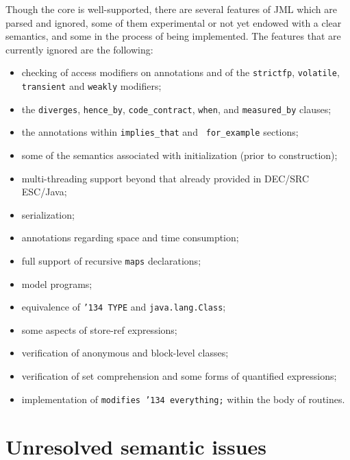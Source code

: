 \documentclass{acm_proc_article-sp}
\begin{document}
Though the core is well-supported, there are several features of JML
which are parsed and ignored, some of them experimental or not yet
endowed with a clear semantics, and some in the process of being implemented.
  The features that are currently ignored are the following:
\setlength{\partopsep}{0in}\setlength{\parskip}{0in}\setlength{\itemsep}{0in}\setlength{\topsep}{0in}
\begin{itemize}
\setlength{\partopsep}{0in}\setlength{\parskip}{0in}\setlength{\itemsep}{0in}\setlength{\topsep}{0in}
\item checking of access modifiers on annotations and of the
 \texttt{strictfp}, \texttt{volatile},
  \texttt{transient} and \texttt{weakly} modifiers;
\item the \texttt{diverges}, \texttt{hence\_by},
  \texttt{code\_contract}, \texttt{when}, and \texttt{measured\_by}
  clauses;
\item the annotations within \texttt{implies\_that} and {\tt
    for\_example} sections;
\item some of the semantics associated with initialization (prior to
  construction);
\item multi-threading support beyond that already provided in DEC/SRC ESC/\-Java;
\item serialization;
\item annotations regarding space and time consumption;
\item full support of recursive \texttt{maps} declarations;
\item model programs;
\item equivalence of \texttt{\char'134 TYPE} and \texttt{java.lang.Class};
\item some aspects of store-ref expressions;
\item verification of anonymous and block-level classes;
\item verification of set comprehension and some forms of quantified
  expressions;
\item implementation of \texttt{modifies \char'134 everything;} within
  the body of routines.
\end{itemize}

\section{Unresolved semantic issues}
\end{document}

